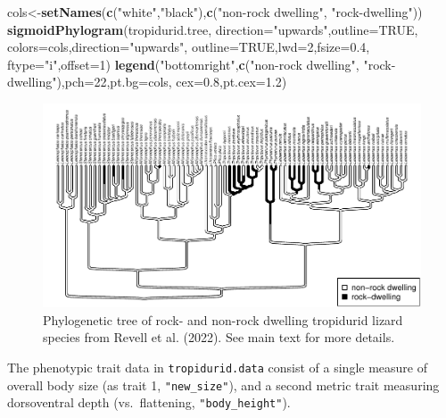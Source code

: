 \documentclass[fleqn,10pt,lineno]{wlpeerj} %
\newenvironment{Shaded}{\begin{snugshade}}{\end{snugshade}}
\newcommand{\AttributeTok}[1]{\textcolor[rgb]{0.13,0.29,0.53}{#1}}
\newcommand{\ConstantTok}[1]{\textcolor[rgb]{0.56,0.35,0.01}{#1}}
\newcommand{\DecValTok}[1]{\textcolor[rgb]{0.00,0.00,0.81}{#1}}
\newcommand{\FloatTok}[1]{\textcolor[rgb]{0.00,0.00,0.81}{#1}}
\newcommand{\FunctionTok}[1]{\textcolor[rgb]{0.13,0.29,0.53}{\textbf{#1}}}
\newcommand{\NormalTok}[1]{#1}
\newcommand{\OtherTok}[1]{\textcolor[rgb]{0.56,0.35,0.01}{#1}}
\newcommand{\StringTok}[1]{\textcolor[rgb]{0.31,0.60,0.02}{#1}}
\begin{document}
\begin{Shaded}
\begin{Highlighting}[]
\NormalTok{cols}\OtherTok{\textless{}{-}}\FunctionTok{setNames}\NormalTok{(}\FunctionTok{c}\NormalTok{(}\StringTok{"white"}\NormalTok{,}\StringTok{"black"}\NormalTok{),}\FunctionTok{c}\NormalTok{(}\StringTok{"non{-}rock dwelling"}\NormalTok{,}
  \StringTok{"rock{-}dwelling"}\NormalTok{))}
\FunctionTok{sigmoidPhylogram}\NormalTok{(tropidurid.tree,}
  \AttributeTok{direction=}\StringTok{"upwards"}\NormalTok{,}\AttributeTok{outline=}\ConstantTok{TRUE}\NormalTok{,}
  \AttributeTok{colors=}\NormalTok{cols,}\AttributeTok{direction=}\StringTok{"upwards"}\NormalTok{,}
  \AttributeTok{outline=}\ConstantTok{TRUE}\NormalTok{,}\AttributeTok{lwd=}\DecValTok{2}\NormalTok{,}\AttributeTok{fsize=}\FloatTok{0.4}\NormalTok{,}
  \AttributeTok{ftype=}\StringTok{"i"}\NormalTok{,}\AttributeTok{offset=}\DecValTok{1}\NormalTok{)}
\FunctionTok{legend}\NormalTok{(}\StringTok{"bottomright"}\NormalTok{,}\FunctionTok{c}\NormalTok{(}\StringTok{"non{-}rock dwelling"}\NormalTok{,}
  \StringTok{"rock{-}dwelling"}\NormalTok{),}\AttributeTok{pch=}\DecValTok{22}\NormalTok{,}\AttributeTok{pt.bg=}\NormalTok{cols,}
  \AttributeTok{cex=}\FloatTok{0.8}\NormalTok{,}\AttributeTok{pt.cex=}\FloatTok{1.2}\NormalTok{)}
\end{Highlighting}
\end{Shaded}

\begin{figure}
\includegraphics[width=1\linewidth]{Revell.phytools-v2_peerj_files/figure-latex/trop-tree-1} \caption{Phylogenetic tree of rock- and non-rock dwelling tropidurid lizard species from Revell et al. (2022). See main text for more details.}\label{fig:trop-tree}
\end{figure}

The phenotypic trait data in \texttt{tropidurid.data} consist of a single measure of overall body size (as trait 1, \texttt{"new\_size"}), and a second metric trait measuring dorsoventral depth (vs.~flattening, \texttt{"body\_height"}).
\end{document}
